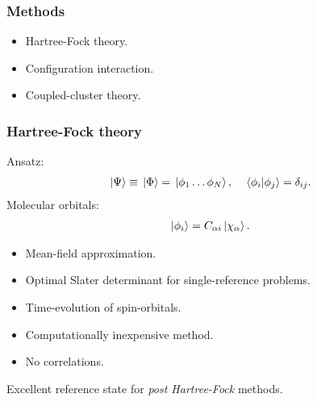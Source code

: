 \documentclass{beamer}
\begin{document}
\begin{frame}
    \frametitle{Methods}
    \begin{itemize}
        \item Hartree-Fock theory.
        \item Configuration interaction.
        \item Coupled-cluster theory.
    \end{itemize}
\end{frame}

\begin{frame}
    \frametitle{Hartree-Fock theory}
    Ansatz:
    \begin{align}
        \ket*{\Psi} \equiv \ket*{\Phi}
        = \ket*{\phi_1 \dots \phi_N},
        \quad
        \braket*{\phi_i}{\phi_j} = \delta_{ij}.
    \end{align}
    Molecular orbitals:
    \begin{align}
        \ket*{\phi_i} = C_{\alpha i}\ket*{\chi_{\alpha}}.
    \end{align}
    \begin{itemize}
        \item Mean-field approximation.
        \item Optimal Slater determinant for single-reference problems.
        \item Time-evolution of spin-orbitals.
        \item Computationally inexpensive method.
        \item No correlations.
    \end{itemize}
    Excellent reference state for \emph{post Hartree-Fock} methods.
\end{frame}

\end{document}
